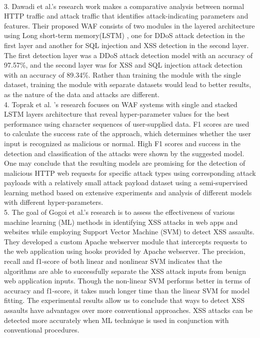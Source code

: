 \\
3.	Dawadi et al.\cite{Dawadi}'s research work makes a comparative analysis between normal HTTP traffic and attack traffic that identifies attack-indicating parameters and features. Their proposed WAF consists of two modules in the layered architecture using Long short-term memory(LSTM) , one for DDoS attack detection in the first layer and another for SQL injection and XSS detection in the second layer. The first detection layer was a DDoS attack detection model with an accuracy of 97.57\%, and the second layer was for XSS and SQL injection attack detection with an accuracy of 89.34\%. Rather than training the module with the single dataset, training the module with separate datasets would lead to better results, as the nature of the data and attacks are different. \\
4.	Toprak et al. \cite{Toprak}'s research focuses on WAF systems with single and stacked LSTM layers architecture that reveal hyper-parameter values for the best performance using character sequences of user-supplied data. F1 scores are used to calculate the success rate of the approach, which determines whether the user input is recognized as malicious or normal. High F1 scores and success in the detection and classification of the attacks were shown by the suggested model. One may conclude that the resulting models are promising for the detection of malicious HTTP web requests for specific attack types using corresponding attack payloads with a relatively small attack payload dataset using a semi-supervised learning method based on extensive experiments and analysis of different models with different hyper-parameters. \\
5.	The goal of Gogoi et al.\cite{Gogoi}'s research is to assess the effectiveness of various machine learning (ML) methods in identifying XSS attacks in web apps and websites while employing Support Vector Machine (SVM) to detect XSS assaults. They developed a custom Apache webserver module that intercepts requests to the web application using hooks
provided by Apache webserver. The precision, recall and f1-score of both linear and nonlinear SVM indicates that the algorithms are able to successfully separate the XSS attack inputs from benign web application inputs. Though the non-linear SVM performs better in terms of accuracy and f1-score, it takes much longer time than the linear SVM for model fitting. The experimental results allow us to conclude that ways to detect XSS assaults have advantages over more conventional approaches. XSS attacks can be detected more accurately when ML technique is used in conjunction with conventional procedures. 
